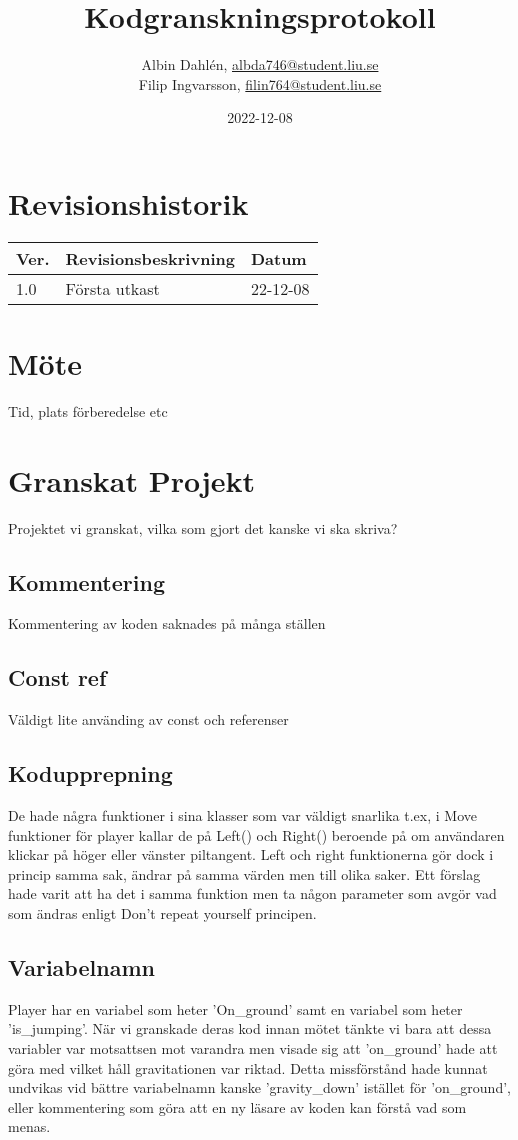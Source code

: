 \documentclass{TDP005mall}
\author{Albin Dahlén, \url{albda746@student.liu.se}\\
  Filip Ingvarsson, \url{filin764@student.liu.se}}
\title{Kodgranskningsprotokoll}
\date{2022-12-08}
\begin{document}
\projectpage
\section{Revisionshistorik}
\begin{table}[!h]
\begin{tabularx}{\linewidth}{|l|X|l|}
\hline
Ver. & Revisionsbeskrivning & Datum \\\hline
1.0 & Första utkast & 22-12-08 \\\hline
\end{tabularx}
\end{table}

\section{Möte}
Tid, plats förberedelse etc

\section{Granskat Projekt}
Projektet vi granskat, vilka som gjort det kanske vi ska skriva?
\subsection{Kommentering}
Kommentering av koden saknades på många ställen

\subsection{Const ref}
Väldigt lite använding av const och referenser

\subsection{Kodupprepning}
De hade några funktioner i sina klasser som var väldigt snarlika t.ex, i Move funktioner för player kallar de på Left() och Right() beroende på om användaren klickar på höger eller vänster piltangent. Left och right funktionerna gör dock i princip samma sak, ändrar på samma värden men till olika saker. Ett förslag hade varit att ha det i samma funktion men ta någon parameter som avgör vad som ändras enligt Don't repeat yourself principen.

\subsection{Variabelnamn}
Player har en variabel som heter 'On\_ground' samt en variabel som heter 'is\_jumping'. När vi granskade deras kod innan mötet tänkte vi bara att dessa variabler var motsattsen mot varandra men visade sig att 'on\_ground' hade att göra med vilket håll gravitationen var riktad. Detta missförstånd hade kunnat undvikas vid bättre variabelnamn kanske 'gravity\_down' istället för 'on\_ground', eller kommentering som göra att en ny läsare av koden kan förstå vad som menas.
\end{document}
